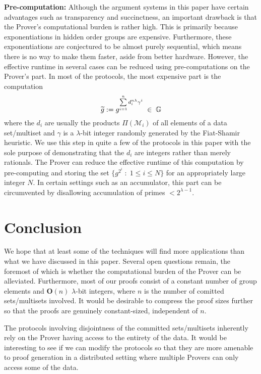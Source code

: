 \documentclass[11pt, lettersize, notitlepage, leqno, footskip=0.6cm]{article}
\newcommand{\slim}{\sum\limits}
\newcommand{\bG}{\mathbb{G}}
\newcommand{\wti}{\widetilde}
\newcommand{\mc}{\mathcal}
\newcommand{\mbf}{\mathbf}
\newcommand{\lam}{\lambda}
\newcommand{\bO}{\mbf{O}}
\newcommand{\mcM}{\mc{M}}
\newcommand{\vs}{\vspace{-0.15cm}}
\newcommand{\noin}{\noindent}
\numberwithin{equation}{section}
\begin{document}

\bigskip

\noin \textbf{Pre-computation:} Although the argument systems in this paper have certain advantages such as transparency and succinctness, an important drawback is that the Prover's computational burden is rather high. This is primarily because exponentiations in hidden order groups are expensive. Furthermore, these exponentiations are conjectured to be almost purely sequential, which means there is no way to make them faster, aside from better hardware. However, the effective runtime in several cases can be reduced using pre-computations on the Prover's part. In most of the protocols, the most expensive part is the computation \vs $$\wti{g}:= g^{\slim_{i=1}^n d_i^{n\lam}\gamma^i }\;\in\; \bG \vs $$ where the $d_i$ are usually the products $\Pi(\mcM_i)$ of all elements of a data set/multiset and $\gamma$ is a $\lam$-bit integer randomly generated by the Fiat-Shamir heuristic. We use this step in quite a few of the protocols in this paper with the sole purpose of demonstrating that the $d_i$ are integers rather than merely rationals. The Prover can reduce the effective runtime of this computation by pre-computing and storing the set $\{g^{2^{i}}\;:\; 1\leq i\leq N \} $ for an appropriately large integer $N$. In certain settings such as an accumulator, this part can be circumvented by disallowing accumulation of primes $< 2^{\lam-1}$.



\section{\fontsize{12}{12}\selectfont Conclusion}

We hope that at least some of the techniques will find more applications than what we have discussed in this paper. Several open questions remain, the foremost of which is whether the computational burden of the Prover can be alleviated. Furthermore, most of our proofs consist of a constant number of group elements and $\bO(n)$ $\lam$-bit integers, where $n$ is the number of comitted sets/multisets involved. It would be desirable to compress the proof sizes further so that the proofs are genuinely constant-sized, independent of $n$. 

The protocols involving disjointness of the committed sets/multisets inherently rely on the Prover having access to the entirety of the data. It would be interesting to see if we can modify the protocols so that they are more amenable to proof generation in a distributed setting where multiple Provers can only access some of the data.
\end{document}
